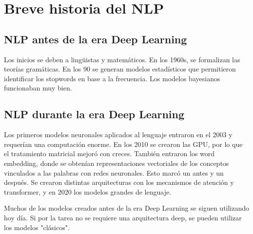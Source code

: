 \section{Breve historia del NLP}
\subsection{NLP antes de la era Deep Learning}
Los inicios se deben a lingüistas y matemáticos. En los 1960s, se formalizan las teorías gramáticas. En los 90 se generan modelos estadísticos que permitieron identificar los stopwords en base a la frecuencia. Los modelos bayesianos funcionaban muy bien.

\subsection{NLP durante la era Deep Learning}
Los primeros modelos neuronales aplicados al lenguaje entraron en el 2003 y requerían una computación enorme. En los 2010 se crearon las GPU, por lo que el tratamiento matricial mejoró con creces. También entraron los word embedding, donde se obtenían representaciones vectoriales de los conceptos vinculados a las palabras con redes neuronales. Esto marcó un antes y un después. Se crearon distintas arquitecturas con los mecanismos de atención y transformer, y en 2020 los modelos grandes de lenguaje.

Muchos de los modelos creados antes de la era Deep Learning se siguen utilizando hoy día. Si por la tarea no se requiere una arquitectura deep, se pueden utilizar los modelos "clásicos". 